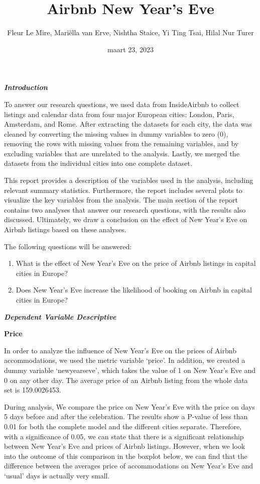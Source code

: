 \documentclass[
]{article}
\title{Airbnb New Year's Eve}
\author{Fleur Le Mire, Mariëlla van Erve, Nishtha Staice, Yi Ting Tsai,
Hilal Nur Turer}
\date{maart 23, 2023}
\begin{document}
\maketitle

\textbf{\emph{Introduction}}

To answer our research questions, we used data from InsideAirbnb to
collect listings and calendar data from four major European cities:
London, Paris, Amsterdam, and Rome. After extracting the datasets for
each city, the data was cleaned by converting the missing values in
dummy variables to zero (0), removing the rows with missing values from
the remaining variables, and by excluding variables that are unrelated
to the analysis. Lastly, we merged the datasets from the individual
cities into one complete dataset.

This report provides a description of the variables used in the
analysis, including relevant summary statistics. Furthermore, the report
includes several plots to visualize the key variables from the analysis.
The main section of the report contains two analyses that answer our
research questions, with the results also discussed. Ultimately, we draw
a conclusion on the effect of New Year's Eve on Airbnb listings based on
these analyses.

The following questions will be answered:

\begin{enumerate}
\def\labelenumi{\arabic{enumi}.}
\item
  What is the effect of New Year's Eve on the price of Airbnb listings
  in capital cities in Europe?
\item
  Does New Year's Eve increase the likelihood of booking on Airbnb in
  capital cities in Europe?
\end{enumerate}

\textbf{\emph{Dependent Variable Descriptive}}

\textbf{Price}

In order to analyze the influence of New Year's Eve on the prices of
Airbnb accommodations, we used the metric variable `price'. In addition,
we created a dummy variable `newyearseve', which takes the value of 1 on
New Year's Eve and 0 on any other day. The average price of an Airbnb
listing from the whole data set is 159.0026453.

During analysis, We compare the price on New Year's Eve with the price
on days 5 days before and after the celebration. The results show a
P-value of less than 0.01 for both the complete model and the different
cities separate. Therefore, with a significance of 0.05, we can state
that there is a significant relationship between New Year's Eve and
prices of Airbnb listings. However, when we look into the outcome of
this comparison in the boxplot below, we can find that the difference
between the averages price of accommodations on New Year's Eve and
`usual' days is actually very small.
\end{document}
